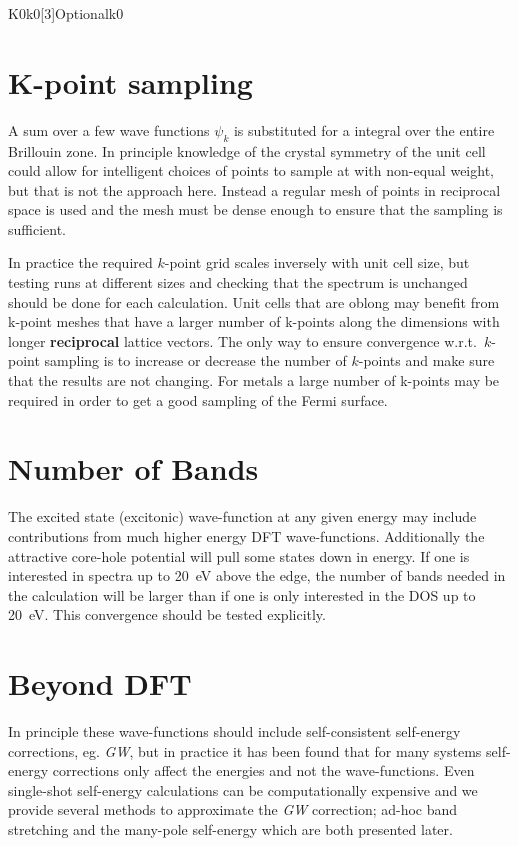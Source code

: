 \documentclass[11pt]{report}
\begin{document}
\begin{Card}{K0}{k0[3]}{Optional}{k0}
\section{K-point sampling}

A sum over a few wave functions $\psi_k$ is substituted for a integral over the entire Brillouin zone. In principle knowledge of the crystal symmetry of the unit cell could allow for intelligent choices of  points to sample at with non-equal weight, but that is not the approach here. Instead a regular mesh of points in reciprocal space is used and the mesh must be dense enough to ensure that the sampling is sufficient. 

In practice the required $k$-point grid scales inversely with unit cell size, but testing runs at different sizes and checking that the spectrum is unchanged should be done for each calculation. Unit cells that are oblong may benefit from k-point meshes that have a larger number of k-points along the dimensions with longer {\bf reciprocal} lattice vectors. The only way to ensure convergence w.r.t.\ $k$-point sampling is to increase or decrease the number of $k$-points and make sure that the results are not changing. For metals a large number of k-points may be required in order to get a good sampling of the Fermi surface.

\section{Number of Bands}

The excited state (excitonic) wave-function at any given energy may include contributions from much higher energy DFT wave-functions. Additionally the attractive core-hole potential will pull some states down in energy. If one is interested in spectra up to 20~eV above the edge, the number of bands needed in the calculation will be larger than if one is only interested in the DOS up to 20~eV. This convergence should be tested explicitly. 

\section{Beyond DFT}

In principle these wave-functions should include self-consistent self-energy corrections, eg. {\it GW}, 
but in practice it has been found that for many systems 
self-energy corrections only affect the energies and not the wave-functions. 
Even single-shot self-energy calculations can be computationally expensive 
and we provide several methods to approximate the {\it GW} correction; 
ad-hoc band stretching and the many-pole self-energy which are both presented later.


\end{Card}
\end{document}
